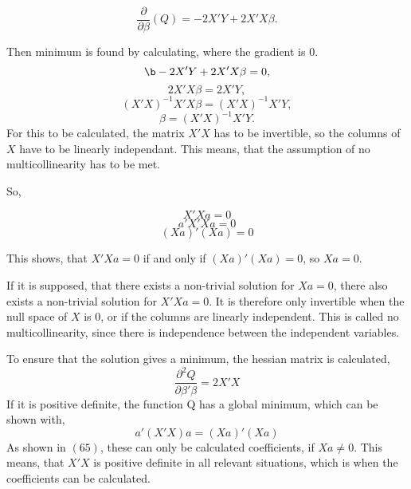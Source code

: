 \begin{equation}
\frac{\partial}{\partial \beta}(Q)=-2 X' Y + 2X' X \beta .
\end{equation}

\noindent Then minimum is found by calculating, where the gradient is 0.
\begin{equation}\b-2 X' Y+ 2X' X \beta =0,\end{equation}
\begin{equation} 2X' X \beta = 2X' Y,\end{equation}
\begin{equation}(X' X)^{-1} X' X \beta = (X' X)^{-1} X' Y,\end{equation}
\begin{equation} \beta=(X' X)^{-1} X' Y.\end{equation}
  For this to be calculated, the matrix $X' X$ has to be invertible, so the columns of $X$ have to be linearly independant.
 This means, that the assumption of no multicollinearity has to be met.
 
 \noindent So, 
 
\begin{equation}
 	X' Xa  =0
\end{equation}
\begin{equation}
 	a' X' X a =0
\end{equation}
\begin{equation}
 	(Xa)'(Xa)=0
\end{equation}
 
 \noindent This shows, that $X'Xa=0$ if and only if $(Xa)'(Xa)=0$, so $Xa=0$. 
 
 \noindent If it is supposed, that there exists a non-trivial solution for $Xa=0$, there also exists a non-trivial solution for $X'Xa=0$. It is therefore only invertible when the null space of $X$ is 0, or if the columns are linearly independent. This is called no multicollinearity, since there is independence between the independent variables. 
 
\noindent To ensure that the solution gives a minimum, the hessian matrix is calculated,
\begin{equation}
 \frac{\partial^2 Q}{\partial \beta' \beta}=2X'X
\end{equation} 
 \noindent If it is positive definite, the function Q has a global minimum, which can be shown with,
\begin{equation}
 a' (X' X)a = (Xa)' (Xa)
\end{equation}  
 \noindent As shown in $(65)$,
 these can only be calculated coefficients, if $Xa \not= 0$. This means, that $X'X$ is positive definite in all relevant situations, which is when the coefficients can be calculated. 
 

